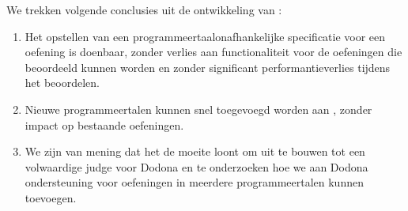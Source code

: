 We trekken volgende conclusies uit de ontwikkeling van \tested{}:

\begin{enumerate}
    \item Het opstellen van een programmeertaalonafhankelijke specificatie voor een oefening is doenbaar, zonder verlies aan functionaliteit voor de oefeningen die beoordeeld kunnen worden en zonder significant performantieverlies tijdens het beoordelen.
    \item Nieuwe programmeertalen kunnen snel toegevoegd worden aan \tested{}, zonder impact op bestaande oefeningen.
    \item We zijn van mening dat het de moeite loont om \tested{} uit te bouwen tot een volwaardige judge voor Dodona en te onderzoeken hoe we aan Dodona ondersteuning voor oefeningen in meerdere programmeertalen kunnen toevoegen.
\end{enumerate}

